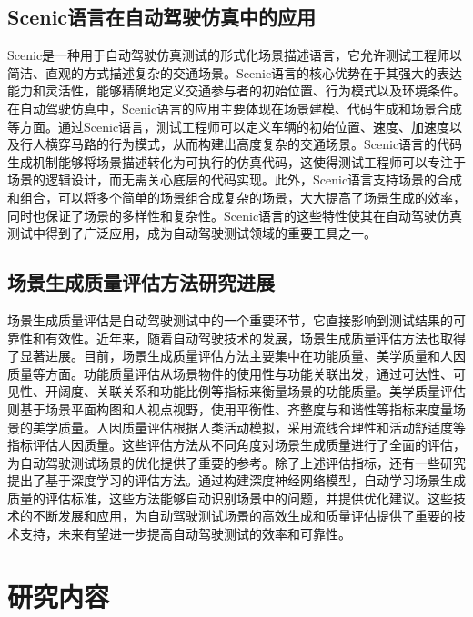 \subsection{Scenic语言在自动驾驶仿真中的应用}
Scenic是一种用于自动驾驶仿真测试的形式化场景描述语言，它允许测试工程师以简洁、直观的方式描述复杂的交通场景。Scenic语言的核心优势在于其强大的表达能力和灵活性，能够精确地定义交通参与者的初始位置、行为模式以及环境条件。在自动驾驶仿真中，Scenic语言的应用主要体现在场景建模、代码生成和场景合成等方面。通过Scenic语言，测试工程师可以定义车辆的初始位置、速度、加速度以及行人横穿马路的行为模式，从而构建出高度复杂的交通场景。Scenic语言的代码生成机制能够将场景描述转化为可执行的仿真代码，这使得测试工程师可以专注于场景的逻辑设计，而无需关心底层的代码实现。此外，Scenic语言支持场景的合成和组合，可以将多个简单的场景组合成复杂的场景，大大提高了场景生成的效率，同时也保证了场景的多样性和复杂性。Scenic语言的这些特性使其在自动驾驶仿真测试中得到了广泛应用，成为自动驾驶测试领域的重要工具之一。

\subsection{场景生成质量评估方法研究进展}
场景生成质量评估是自动驾驶测试中的一个重要环节，它直接影响到测试结果的可靠性和有效性。近年来，随着自动驾驶技术的发展，场景生成质量评估方法也取得了显著进展。目前，场景生成质量评估方法主要集中在功能质量、美学质量和人因质量等方面。功能质量评估从场景物件的使用性与功能关联出发，通过可达性、可见性、开阔度、关联关系和功能比例等指标来衡量场景的功能质量。美学质量评估则基于场景平面构图和人视点视野，使用平衡性、齐整度与和谐性等指标来度量场景的美学质量。人因质量评估根据人类活动模拟，采用流线合理性和活动舒适度等指标评估人因质量。这些评估方法从不同角度对场景生成质量进行了全面的评估，为自动驾驶测试场景的优化提供了重要的参考。除了上述评估指标，还有一些研究提出了基于深度学习的评估方法。通过构建深度神经网络模型，自动学习场景生成质量的评估标准，这些方法能够自动识别场景中的问题，并提供优化建议。这些技术的不断发展和应用，为自动驾驶测试场景的高效生成和质量评估提供了重要的技术支持，未来有望进一步提高自动驾驶测试的效率和可靠性。


\section{研究内容}

